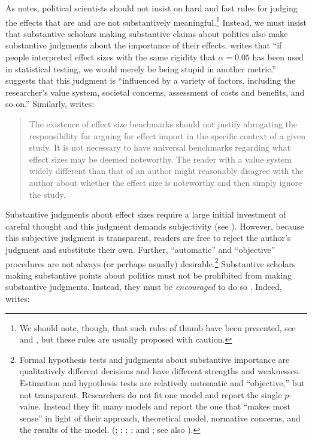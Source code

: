 \documentclass[12pt]{article}
\begin{document}
As \cite{Rainey2014a} notes, political scientists should not insist on hard and fast rules for judging the effects that are and are not substantively meaningful.\footnote{We should note, though, that such rules of thumb have been presented, see \cite{Glass1976} and \cite{Cohen1992}, but these rules are usually proposed with caution.} Instead, we must insist that substantive scholars making substantive claims about politics also make substantive judgments about the importance of their effects. \citet[pp. 82-83]{Thompson2001} writes that ``if people interpreted effect sizes with the same rigidity that $\alpha = 0.05$ has been used in statistical testing, we would merely be being stupid in another metric.'' \cite{Kirk1996} suggests that this judgment is ``influenced by a variety of factors, including the researcher's value system, societal concerns, assessment of costs and benefits, and so on.'' Similarly, \citet[p. 30]{Thompson2002} writes: 

\begin{quote}
The existence of effect size benchmarks should not justify abrogating the responsibility for arguing for effect import in the specific context of a given study. It is not necessary to have universal benchmarks regarding what effect sizes may be deemed noteworthy. The reader with a value system widely different than that of an author might reasonably disagree with the author about whether the effect size is noteworthy and then simply ignore the study.
\end{quote}

Substantive judgments about effect sizes require a large initial investment of careful thought and this judgment demands subjectivity (see \citealt{Rainey2014a}). However, because this subjective judgment is transparent, readers are free to reject the author's judgment and substitute their own. Further, ``automatic'' and ``objective'' procedures are not always (or perhaps usually) desirable.\footnote{Formal hypothesis tests and judgments about substantive importance are qualitatively different decisions and have different strengths and weaknesses. Estimation and hypothesis tests are relatively automatic and ``objective,'' but not transparent. Researchers do not fit one model and report the single $p$-value. Instead they fit many models and report the one that ``makes most sense'' in light of their approach, theoretical model, normative concerns, and the results of the model. (\citealt{GerberMalhotra2008}; \citealt{SimmonsNelsonSimonsohn2011}; \citealt{Francis2013}; \citealt{SimmonsNelsonSimonsohn2014}; and \citealt{EsareyWu2014}; see also \citealt{GelmanLoken2014}).} Substantive scholars making substantive points about politics must not be prohibited from making substantive judgments. Instead, they must be \emph{encouraged} to do so \citep{Achen1982}. Indeed, \citet[p. 755]{Kirk1996} writes:
\end{document}
